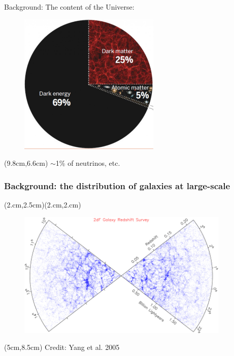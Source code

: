 \documentclass[aspectratio=43]{beamer}
\begin{document}
\begin{frame}{Background:}
The content of the Universe:
\begin{figure}
    \includegraphics[width=0.6\textwidth]{fraction.jpg}
\end{figure}
\begin{textblock*}{3cm}(9.8cm,6.6cm)
{$\sim$1\% of neutrinos, etc.}
\end{textblock*}
\end{frame}

\begin{frame}
  \frametitle{Background: the distribution of galaxies at large-scale}
  (2.cm,2.5cm)(2.cm,2.cm)
  \begin{figure}
    \includegraphics[width=0.9\textwidth]{2dFzcone.jpg}
  \end{figure}
  \begin{textblock*}{4cm}(5cm,8.5cm)
    {Credit: Yang et al. 2005}
  \end{textblock*}
\end{frame}
\end{document}
